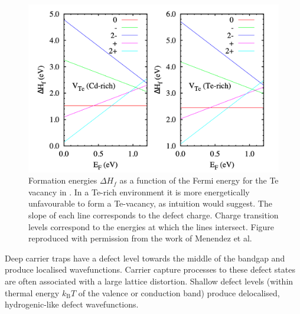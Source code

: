 \begin{figure}[h]
\centering
  \includegraphics[width=0.8\columnwidth]{figures/ch3/defectenergetics.png}
  \caption[Formation energies of the Te vacancy in CdTe]{Formation energies $\Delta H_f$ as a function of the Fermi energy for the Te vacancy in . In a Te-rich environment it is more energetically unfavourable to form a Te-vacancy, as intuition would suggest. The slope of each line corresponds to the defect charge. Charge transition levels correspond to the energies at which the lines intersect. Figure reproduced with permission from the work of Menendez et al.\autocite{Menendez2016}}
  \label{CdTeformation}
\end{figure}%

Deep carrier traps have a defect level towards the middle of the bandgap and produce localised wavefunctions. Carrier capture processes to these defect states are often associated with a large lattice distortion. Shallow defect levels (within thermal energy $k_\mathrm{B}T$ of the valence or conduction band) produce delocalised, hydrogenic-like defect wavefunctions. 



